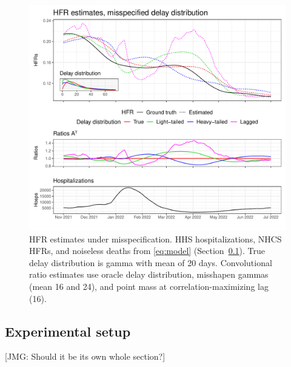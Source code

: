 \documentclass{article}
\newcommand{\djmcomment}[1]{{\color{teal}[DJM: #1]}}
\newcommand{\jmgcomment}[1]{{\color{cyan}[JMG: #1]}}
\begin{document}
\begin{figure}
    \centering
    \includegraphics[width=.8\linewidth]{Figures/Simulated/toy_misp.pdf}
    \caption{HFR estimates under misspecification. HHS hospitalizations, NHCS HFRs, and noiseless deaths from \eqref{eq:model} (Section~\ref{sec:setup}). True delay distribution is gamma with mean of 20 days. 
    Convolutional ratio estimates use oracle delay distribution, misshapen gammas (mean 16 and 24), and point mass at correlation-maximizing lag (16).}%
    \label{fig:misspecified}
\end{figure}


\subsection{Experimental setup}\label{sec:setup}
\jmgcomment{Should it be its own whole section?}
\end{document}
